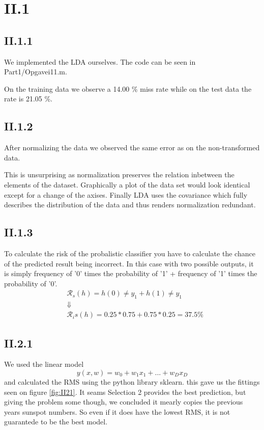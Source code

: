 \documentclass{article}
\begin{document}
\section{II.1}

\subsection{II.1.1}

We implemented the LDA ourselves. The code can be seen in
Part1/Opgavei11.m. 

On the training data we observe a 14.00 \% miss rate while on the test data
the rate is 21.05 \%.

\subsection{II.1.2}

After normalizing the data we observed the same error as on the
non-transformed data. 

This is unsurprising as normalization preserves the relation inbetween
the elements of the dataset. Graphically a plot of the data set would
look identical except for a change of the axises. Finally LDA uses the
covariance which fully describes the distribution of the data and thus
renders normalization redundant.

\subsection{II.1.3}

To calculate the risk of the probalistic classifier you have to
calculate the chance of the predicted result being incorrect. In this
case with two possible outputs, it is simply frequency of '0' times the
probability of '1' + frequency of '1' times the probability of '0'.\\

\begin{align*}
  &\mathcal{R}_s(h) = {h(0) \neq y_1} + {h(1) \neq y_1}\\
  &\Downarrow\\
  &\mathcal{R}_is(h) = 0.25 * 0.75 + 0.75 * 0.25 = 37.5 \%
\end{align*}

\subsection{II.2.1}

We used the linear model
\begin{equation}
    y(x, w) = w_0 + w_1 x_1 + ... + w_D x_D
\end{equation}
and calculated the RMS using the python library sklearn. this gave us the fittings seen on 
figure \ref{fig:II21}. It seams Selection 2 provides the best prediction, but giving the problem some though, we concluded it mearly copies
the previous years sunspot numbers. So even if it does have the lowest RMS, it is not guarantede to be the best model.
\end{document}
